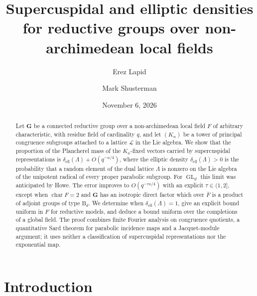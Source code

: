 \documentclass[11pt,reqno]{amsart}
\numberwithin{equation}{section}
\theoremstyle{plain}
\theoremstyle{definition}
\theoremstyle{remark}
\theoremstyle{plain}
\newcommand{\Lat}{\mathcal{L}}   %
\newcommand{\dLat}{\Lambda}      %
\newcommand{\bG}{\mathbf{G}}     %
\newcommand{\g}{\mathfrak{g}}    %
\newcommand{\gd}{\mathfrak{g}^*} %
\newcommand{\elld}[2][]{\delta_{\mathrm{ell}}^{#1}(#2)}  %
\DeclareMathOperator{\GL}{GL}
\DeclareMathOperator{\chr}{char}   %
\newcommand{\eexp}{\tau}
\begin{document}
\title[Supercuspidal and elliptic densities]
{Supercuspidal and elliptic densities for reductive groups over non-archimedean local fields}

\author{Erez Lapid}
\address{Department of Mathematics, Weizmann Institute of Science, Rehovot 7610001, Israel}

\author{Mark Shusterman}
\address{Department of Mathematics, Weizmann Institute of Science, Rehovot 7610001, Israel}

\date{November 6, 2026}

\begin{abstract}
Let $\bG$ be a connected reductive group over a non-archimedean local
field $F$ of arbitrary characteristic, with residue field of cardinality
$q$, and let $(K_n)$ be a tower of principal congruence subgroups attached
to a lattice $\Lat$ in the Lie algebra. We show that the proportion of the
Plancherel mass of the $K_n$-fixed vectors carried by supercuspidal
representations is $\elld{\dLat}+O(q^{-n/4})$, where the elliptic density
$\elld{\dLat}>0$ is the probability that a random element of the dual
lattice $\dLat$ is nonzero on the Lie algebra of the unipotent radical
of every proper parabolic subgroup. For $\GL_d$ this limit was anticipated by
Howe. The error improves to $O(q^{-\eexp n/4})$ with an explicit
$\eexp\in(1,2]$, except when $\chr F=2$ and $\bG$ has an isotropic direct
factor which over $\bar F$ is a product of adjoint groups of type
$\mathrm B_d$. We determine when $\elld{\dLat}=1$, give an explicit bound
uniform in $F$ for reductive models, and deduce a bound uniform over the
completions of a global field. The proof combines finite Fourier analysis
on congruence quotients, a quantitative Sard theorem for parabolic
incidence maps and a Jacquet-module argument; it uses neither a
classification of supercuspidal representations nor the exponential map.
\end{abstract}

\maketitle

\setcounter{tocdepth}{1}
\tableofcontents

\section{Introduction}\label{sec:intro}
\end{document}
